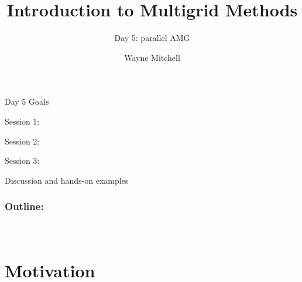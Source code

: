 \documentclass[18pt,xcolor=table]{beamer}
\title[Multigrid]{Introduction to Multigrid Methods}
\subtitle{Day 5: parallel AMG}
\author[Mitchell]{Wayne Mitchell}
\institute{\pgfuseimage{logo}\\Universit\"at Heidelberg\\Institut f\"ur Technische Informatik}
\date[]{\alert{}}
\begin{document}


\DeclareRobustCommand{\Chi}{\raisebox{2pt}{$\chi$}}

\begin{frame}{}
\begin{block}{Day 5 Goals}
\bit
\item Session 1:
\bit
\item 
\item 
\eit
\item Session 2:
\bit
\item 
\item 
\eit
\item Session 3:
\bit
\item Discussion and hands-on examples
\eit
\eit
\end{block}
\end{frame}

\begin{frame}
\frametitle{\bf Outline:}
\framesubtitle{~~}
\tableofcontents
\end{frame}


\section{}

\begin{frame}{}
\begin{block}{}
\bit
\item 
\eit
\end{block}
\end{frame}



\section{Motivation}
\end{document}
